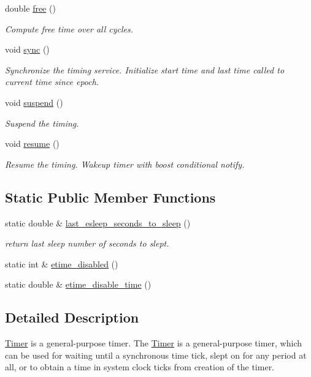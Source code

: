\begin{DoxyCompactItemize}
double \hyperlink{classRCS_1_1Timer_af7ed219a6157e28f7555a2c52d3c10f0}{free} ()
\begin{DoxyCompactList}\small\item\em Compute free time over all cycles. \end{DoxyCompactList}\item 
void \hyperlink{classRCS_1_1Timer_a6e97c4f4d236d76f9e21f07b2a4ee542}{sync} ()
\begin{DoxyCompactList}\small\item\em Synchronize the timing service. Initialize start time and last time called to current time since epoch. \end{DoxyCompactList}\item 
void \hyperlink{classRCS_1_1Timer_ae83a5a6260dd5d79ab884ef593df2db3}{suspend} ()
\begin{DoxyCompactList}\small\item\em Suspend the timing. \end{DoxyCompactList}\item 
void \hyperlink{classRCS_1_1Timer_a4ff4189ac7fe91e9eb647b5e1d5e55b7}{resume} ()
\begin{DoxyCompactList}\small\item\em Resume the timing. Wakeup timer with boost conditional notify. \end{DoxyCompactList}\end{DoxyCompactItemize}
\subsection*{Static Public Member Functions}
\begin{DoxyCompactItemize}
\item 
static double \& \hyperlink{classRCS_1_1Timer_a9f48b5e2bd0504c75fee1b47c6ea8047}{last\-\_\-esleep\-\_\-seconds\-\_\-to\-\_\-sleep} ()
\begin{DoxyCompactList}\small\item\em return last sleep number of seconds to slept. \end{DoxyCompactList}\item 
static int \& \hyperlink{classRCS_1_1Timer_a98f34c3fdfda98529ebdffdf1019ac5e}{etime\-\_\-disabled} ()
\item 
static double \& \hyperlink{classRCS_1_1Timer_ace5214da460a817d1a90d87636efe11e}{etime\-\_\-disable\-\_\-time} ()
\end{DoxyCompactItemize}


\subsection{Detailed Description}
\hyperlink{classRCS_1_1Timer}{Timer} is a general-\/purpose timer. The \hyperlink{classRCS_1_1Timer}{Timer} is a general-\/purpose timer, which can be used for waiting until a synchronous time tick, slept on for any period at all, or to obtain a time in system clock ticks from creation of the timer. 

